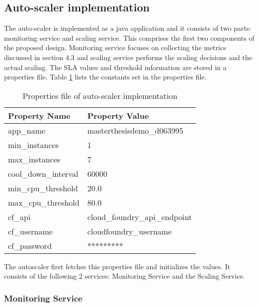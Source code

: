 \documentclass[article,type=msc,colorback,12pt,accentcolor=tud8b,table]{tudthesis}
\begin{document}
	\subsection{Auto-scaler implementation} 
	
	The auto-scaler is implemented as a java application and it consists of two parts: monitoring service and scaling service. This comprises the first two components of the proposed design. Monitoring service focuses on collecting the metrics discussed in section 4.3 and scaling service performs the scaling decisions and the actual scaling. The SLA values and threshold information are stored in a properties file. Table \ref{tab:as_properties} lists the constants set in the properties file. 
	
	\begin{table}[H]
		\centering
		\label{tab:as_properties}
		\begin{tabular}{|l|l|}
			\hline
			\rowcolor[HTML]{EC6500} 
			Property Name        & Property Value                \\ \hline
			app\_name            & masterthesisdemo\_d063995     \\ \hline
			min\_instances       & 1                             \\ \hline
			max\_instances       & 7                             \\ \hline
			cool\_down\_interval & 60000                         \\ \hline
			min\_cpu\_threshold  & 20.0                          \\ \hline
			max\_cpu\_threshold  & 80.0                          \\ \hline
			cf\_api              & cloud\_foundry\_api\_endpoint \\ \hline
			cf\_username         & cloudfoundry\_username           \\ \hline
			cf\_password         & *********                     \\ \hline
		\end{tabular}
		\caption{Properties file of auto-scaler implementation}
	\end{table}
	
	The autoscaler first fetches this properties file and initializes the values. It consists of the following 2 services: Monitoring Service and the Scaling Service. 
	
\subsubsection{Monitoring Service}
	
\end{document}
